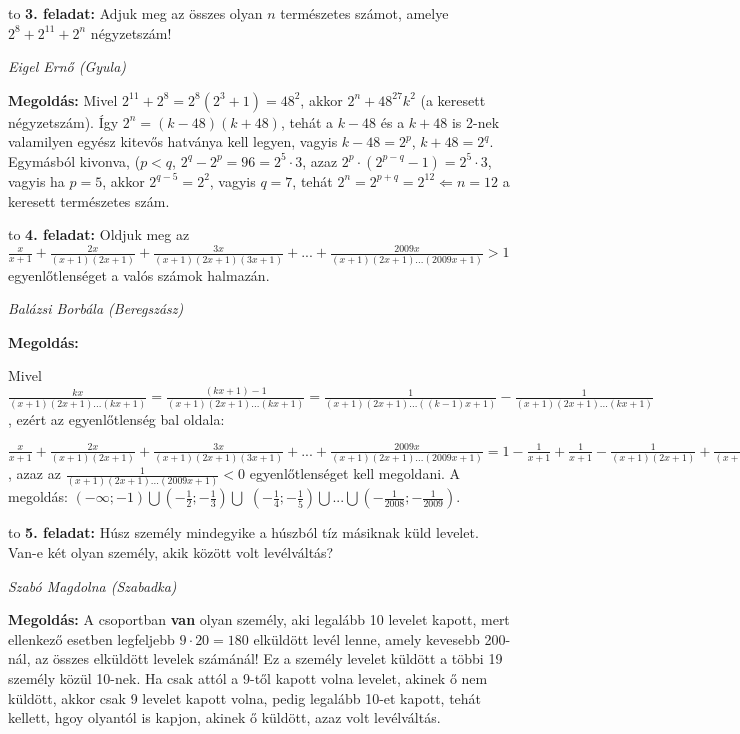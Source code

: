 \documentclass[a4paper,10pt]{article}
\def\ki#1#2{\hfill {\it #1 (#2)}\medskip}
\begin{document}
\hbox to 
{\bf 3. feladat: } 
Adjuk meg az összes olyan $n$ természetes számot, amelye $2^8+2^11+2^n$ négyzetszám!

\ki{Eigel Ernő}{Gyula}\medskip

{\bf Megoldás: } Mivel $2^{11}+2^8=2^8(2^3+1)=48^2$, akkor $2^n+48^27k^2$ (a keresett négyzetszám). Így $2^n=(k-48)(k+48)$, tehát a $k-48$ és a $k+48$ is 2-nek valamilyen egyész kitevős hatványa kell legyen, vagyis $k-48=2^p$, $k+48=2^q$. Egymásból kivonva, ($p<q$, $2^q-2^p=96=2^5\cdot 3$, azaz $2^p\cdot(2^{p-q}-1)=2^5\cdot 3$, vagyis ha $p=5$, akkor $2^{q-5}=2^2$, vagyis $q=7$, tehát $2^n=2^{p+q}=2^{12} \Leftarrow n=12$ a keresett természetes szám.
\medskip


\hbox to 
{\bf 4. feladat: } 
Oldjuk meg az $\frac{x}{x+1}+\frac{2x}{(x+1)(2x+1)}+\frac{3x}{(x+1)(2x+1)(3x+1)}+...+\frac{2009x}{(x+1)(2x+1)...(2009x+1)}>1$ egyenlőtlenséget a valós számok halmazán.

\ki{Balázsi Borbála}{Beregszász}\medskip

{\bf Megoldás: } 

Mivel $\frac{kx}{(x+1)(2x+1)...(kx+1)}=\frac{(kx+1)-1}{(x+1)(2x+1)...(kx+1)}=\frac{1}{(x+1)(2x+1)...((k-1)x+1)}-\frac{1}{(x+1)(2x+1)...(kx+1)}$, ezért az egyenlőtlenség bal oldala:

$\frac{x}{x+1}+\frac{2x}{(x+1)(2x+1)}+\frac{3x}{(x+1)(2x+1)(3x+1)}+...+\frac{2009x}{(x+1)(2x+1)...(2009x+1)}=1-\frac{1}{x+1}+\frac{1}{x+1}-\frac{1}{(x+1)(2x+1)}+\frac{1}{(x+1)(2x+1)}-\frac{1}{(x+1)(2x+1)(3x+1)}+...+\frac{1}{(x+1)(2x+1)...(2008x+1)}-\frac{1}{(x+1)(2x+1)...(2009x+1)}=1-\frac{1}{(x+1)(2x+1)...(2009x+1})$, azaz az $\frac{1}{(x+1)(2x+1)...(2009x+1)}<0$ egyenlőtlenséget kell megoldani. A megoldás: $(-\infty;-1)\bigcup(-\frac12;-\frac13)\bigcup$ $(-\frac14;-\frac15)\bigcup...\bigcup(-\frac{1}{2008};-\frac{1}{2009})$.

\medskip


\hbox to 
{\bf 5. feladat: } 
Húsz személy mindegyike a húszból tíz másiknak küld levelet. Van-e két olyan személy, akik között volt levélváltás?

\ki{Szabó Magdolna}{Szabadka}\medskip

{\bf Megoldás: } A csoportban {\bf van} olyan személy, aki legalább 10 levelet kapott, mert ellenkező esetben legfeljebb $9\cdot 20=180$ elküldött levél lenne, amely kevesebb 200-nál, az összes elküldött levelek számánál! Ez a személy levelet küldött a többi 19 személy közül 10-nek. Ha csak attól a 9-től kapott volna levelet, akinek ő nem küldött, akkor csak 9 levelet kapott volna, pedig legalább 10-et kapott, tehát kellett, hgoy olyantól is kapjon, akinek ő küldött, azaz volt levélváltás.
\medskip
\end{document}

